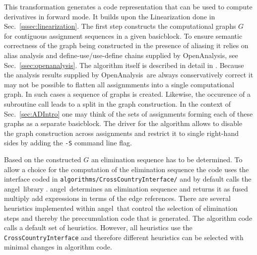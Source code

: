 \documentclass[11pt]{article}
\newcommand{\angel}{angel}
\newcommand{\basicblock}{basicblock}
\newcommand{\OpenAnalysis}{OpenAnalysis}
\newcommand{\code}[1]{{\small\tt{#1}}}
\newcommand{\refsec}[1]{{Sec.~\ref{#1}}}
\begin{document}
This transformation generates a code representation that can be used 
to compute derivatives in forward mode. It builds upon the Linearization
done in \refsec{sssec:linearization}. 
The first step constructs the 
computational graphs $G$ 
for contiguous 
assignment sequences in a given \basicblock. To ensure semantic 
correctness of the graph being constructed in the presence of 
aliasing it relies on alias analysis and define-use/use-define chains 
supplied by \OpenAnalysis, see \refsec{ssec:openanalysis}.
The algorithm itself is described in detail in \cite{Utk04FBB}.
Because the analysis results supplied by \OpenAnalysis\ are always 
conservatively correct it may not be possible to flatten all 
assignmments into a single computational graph. In such cases 
a sequence of graphs is created. Likewise, the occurence 
of a subroutine call leads to a split in the graph construction. 
In the context of \refsec{sec:ADIntro} one may think of the sets of 
assignments forming each of these graphs as a separate \basicblock. 
The driver for the algorithm allows to disable 
the graph construction across assignments and restrict it to 
single right-hand sides by adding the \code{-S} command 
line flag. 

Based on the constructed $G$ an elimination sequence has to be determined.
To allow a choice for the computation of the elimination sequence 
the code uses the interface coded in \code{algorithms/CrossCountryInterface/}
and by default calls the \angel\ library \cite{angelWeb}.
\angel\ determines an elimination sequence and returns it as 
fused multiply add expressions in terms of the edge references.
There are several heuristics implemented within \angel\ that control 
the selection of elimination steps and thereby the preccumulation code 
that is generated.  The algorithm code calls a default set of heuristics. 
However, all heuristics use the \code{CrossCountryInterface} and therefore 
different heuristics can be selected with minimal changes in algorithm code.   
\end{document}
